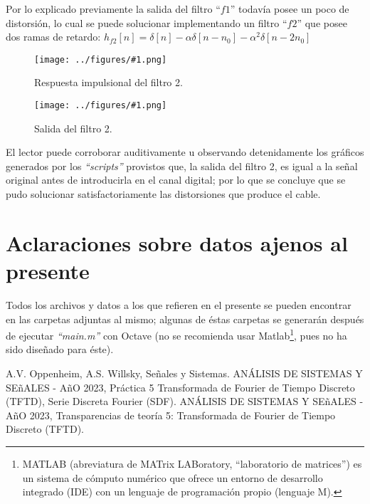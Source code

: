 \documentclass[letterpaper, 10 pt, conference]{ieeeconf}  %
\newcommand{\image}[2] {
  \begin{figure}[H]
    \centering
    \texttt{[image: ../figures/\#1.png]}
    \caption{#2}
    \label{fig:#1}
  \end{figure}
}
\begin{document}
Por lo explicado previamente la salida del filtro ``$f1$'' todav\'ia posee un poco de distorsi\'on, lo cual se puede solucionar implementando un filtro ``$f2$'' que posee dos ramas de retardo: $h_{f2}[n] = \delta[n] - \alpha\delta[n-n_0] - \alpha^2\delta[n-2n_0]$ 
\image{h-filtro2}{Respuesta impulsional del filtro 2.}
\image{y-filtro2}{Salida del filtro 2.}

El lector puede corroborar auditivamente u observando detenidamente los gr\'aficos generados por los \textit{``scripts''} provistos que, la salida del filtro 2, es igual a la se\~nal original antes de introducirla en el canal digital; por lo que se concluye que se pudo solucionar satisfactoriamente las distorsiones que produce el cable.

\section{Aclaraciones sobre datos ajenos al presente}
Todos los archivos y datos a los que refieren en el presente se pueden encontrar en las carpetas adjuntas al mismo; algunas de \'estas carpetas se generar\'an despu\'es de ejecutar \textit{``main.m''} con Octave (no se recomienda usar Matlab\footnote{MATLAB (abreviatura de MATrix LABoratory, ``laboratorio de matrices'') es un sistema de c\'omputo num\'erico que ofrece un entorno de desarrollo integrado (IDE) con un lenguaje de programaci\'on propio (lenguaje M).}, pues no ha sido dise\~nado para \'este).

\begin{thebibliography}{99}
  
A.V. Oppenheim, A.S. Willsky, Se\~nales y Sistemas.
ANÁLISIS DE SISTEMAS Y SE\~{n}ALES - A\~{n}O 2023, Práctica 5 Transformada de Fourier de Tiempo Discreto (TFTD), Serie Discreta Fourier (SDF).
ANÁLISIS DE SISTEMAS Y SE\~{n}ALES - A\~{n}O 2023, Transparencias de teor\'ia 5: Transformada de Fourier de Tiempo Discreto (TFTD).

\end{thebibliography}
\end{document}
